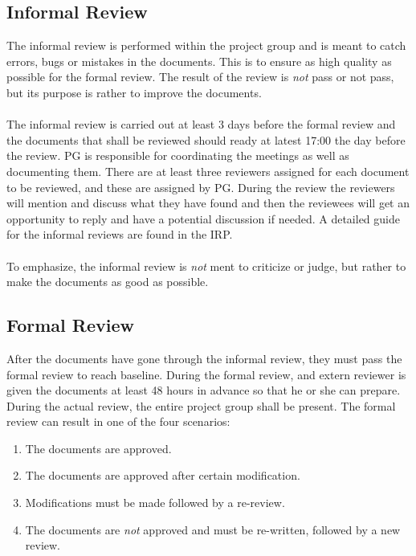 \documentclass{article}
\begin{document}
    \subsection{Informal Review \label{informalreview}}
        The informal review is performed within the project group and is meant to catch
        errors, bugs or mistakes in the documents. This is to ensure as high quality
        as possible for the formal review. The result of the review is \emph{not} pass or
        not pass, but its purpose is rather to improve the documents.
        \\ \\
        The informal review is carried out at least 3 days before the formal review and the documents that
        shall be reviewed should ready at latest 17:00 the day before the review.    PG is responsible
        for coordinating the meetings as well as documenting them.
        There are at least three reviewers assigned for each document to be reviewed, and these
        are assigned by PG. During the review the reviewers will mention and discuss what they have
        found and then the reviewees will get an opportunity to reply and have a potential discussion
        if needed. A detailed guide for the informal reviews are found in the IRP. 
        \\ \\
        To emphasize, the informal review is \emph{not} ment to criticize or judge, but rather
        to make the documents as good as possible. 
        
    
    \subsection{Formal Review \label{formalreview}}
        After the documents have gone through the informal review, they must pass the formal review
        to reach baseline. During the formal review, and extern reviewer is
        given the documents at least 48 hours in advance so that he or she can prepare.
        During the actual review, the entire project group shall be present.
        The formal review can result in one of the four scenarios:
        \begin{enumerate}
            \item The documents are approved.
            \item The documents are approved after certain modification.
            \item Modifications must be made followed by a re-review.
            \item The documents are \emph{not} approved and must be re-written,
                    followed by a new review.
        \end{enumerate}
    
\end{document}

